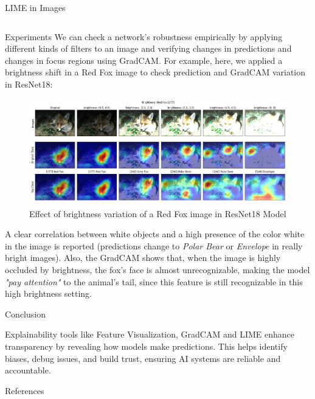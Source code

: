 \documentclass[final]{beamer}
\newlength{\colwidth}
\begin{document}
\begin{frame}[t]
\begin{columns}[t]
\begin{column}{\colwidth}
\begin{block}{LIME in Images}
\begin{columns}
    \end{columns}


  \end{block}

  \begin{block}{Experiments}
    We can check a network's robustness empirically by applying different kinds of filters 
    to an image and verifying changes in predictions and changes in focus regions using GradCAM.
    For example, here, we applied a brightness shift in a Red Fox image to check prediction and GradCAM variation in ResNet18:

    \begin{figure}
      \centering
      \includegraphics[width=0.96\linewidth]{images/fox-grad-cam-exp.png}
      \caption{Effect of brightness variation of a Red Fox image in ResNet18 Model}
    \end{figure}

    A clear correlation between white objects and a high presence of the color white in the image is reported 
    (predictions change to \textit{Polar Bear} or \textit{Envelope} in really bright images).
    Also, the GradCAM shows that, when the image is highly occluded by brightness, the fox's face is almost unrecognizable, 
    making the model \textit{"pay attention"} to the animal's tail, since this feature is still recognizable in this high brightness setting.
  \end{block}

  \begin{block}{Conclusion}

    Explainability tools like Feature Visualization, GradCAM and LIME enhance transparency by revealing how models make predictions. 
    This helps identify biases, debug issues, and build trust, ensuring AI systems are reliable and accountable.
  \end{block}

  \begin{block}{References}
    \nocite{*}
    

  \end{block}

\end{column}

\end{columns}
\end{frame}
\end{document}
